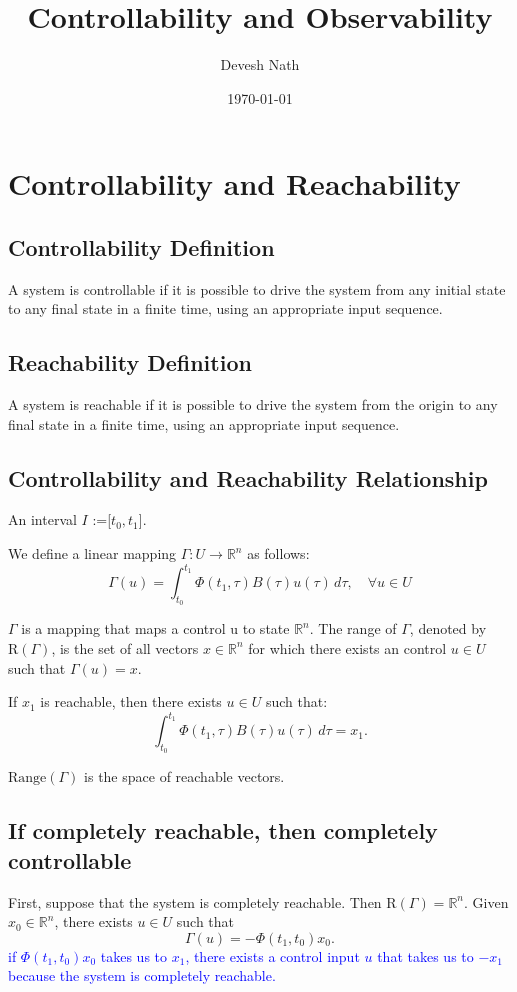 \documentclass{article}
\title{Controllability and Observability}
\author{Devesh Nath}
\date{\today}
\begin{document}
\maketitle

\section{Controllability and Reachability}

\subsection{Controllability Definition}
A system is controllable if it is possible to drive the system from any initial state to any final state in a finite time, using an appropriate input sequence. 

\subsection{Reachability Definition}
A system is reachable if it is possible to drive the system from the origin to any final state in a finite time, using an appropriate input sequence.

\subsection{Controllability and Reachability Relationship}
An interval $I$ :=[$t_0,t_1$].

We define a linear mapping $\Gamma : U \rightarrow \mathbb{R}^n$ as follows:
\[
\Gamma(u) = \int_{t_0}^{t_1} \Phi(t_1, \tau) B(\tau) u(\tau) \, d\tau, \quad \forall u \in U
\]

$\Gamma$ is a mapping that maps a control u to state $\mathbb{R}^n$. 
The range of $\Gamma$, denoted by $\text{R}(\Gamma)$, is the set of all vectors $x \in \mathbb{R}^n$ for which there exists an control $u \in U$ such that $\Gamma(u) = x$. 

If $x_1$ is reachable, then there exists $u \in U$ such that:
\[
\int_{t_0}^{t_1} \Phi(t_1, \tau) B(\tau) u(\tau) \, d\tau = x_1.
\]

$\text{Range}(\Gamma)$ is the space of reachable vectors.

\subsection{If completely reachable, then completely controllable}
First, suppose that the system is completely reachable. Then $\text{R}(\Gamma) = \mathbb{R}^n$. Given $x_0 \in \mathbb{R}^n$, there exists $u \in U$ such that
\[
\Gamma(u) = -\Phi(t_1, t_0)x_0.
\]
\textcolor{blue}{if $\Phi(t_1, t_0)x_0$ takes us to $x_1$, there exists a control input $u$ that takes us to $-x_1$ because the system is completely reachable.}
\end{document}
